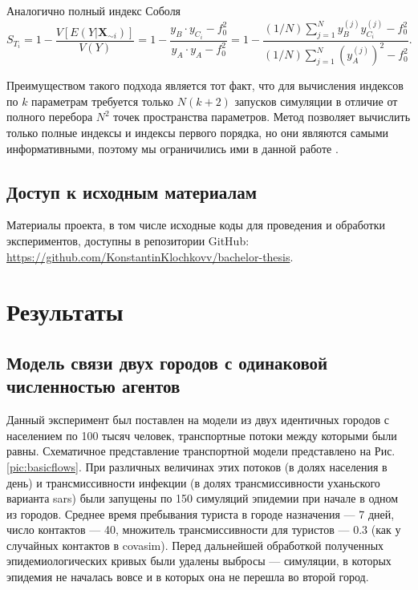\documentclass[a4paper,12pt]{article} %
\begin{document}
\begin{itemize}
Аналогично полный индекс Соболя
\begin{displaymath}
S_{T_i}=1-\frac{V[E(Y|\bm{X}_{\sim i})]}{V(Y)}=1-\frac{y_B\cdot y_{C_i}-f_0^2}{y_A\cdot y_A -f_0^2}=1-\frac{(1/N)\sum_{j=1}^N y_B^{(j)}y_{C_i}^{(j)} - f_0^2}{(1/N)\sum_{j=1}^N (y_A^{(j)})^2 - f_0^2}.
\end{displaymath}
\end{itemize}

Преимуществом такого подхода является тот факт, что для вычисления индексов по $k$ параметрам требуется только $N(k+2)$ запусков симуляции в отличие от полного перебора $N^2$ точек пространства параметров. Метод позволяет вычислить только полные индексы и индексы первого порядка, но они являются самыми информативными, поэтому мы ограничились ими в данной работе \cite{saltelli2008global}.

\subsection{Доступ к исходным материалам}
Материалы проекта, в том числе исходные коды для проведения и обработки экспериментов, доступны в репозитории GitHub: \href{https://github.com/KonstantinKlochkovv/bachelor-thesis}{https://github.com/KonstantinKlochkovv/\-bachelor-thesis}.

\newpage
\section{Результаты}

\subsection{Модель связи двух городов с одинаковой численностью агентов}
Данный эксперимент был поставлен на модели из двух идентичных городов с населением по 100 тысяч человек, транспортные потоки между которыми были равны. Схематичное представление транспортной модели представлено на Рис. \ref{pic:basicflows}. При различных величинах этих потоков (в долях населения в день) и трансмиссивности инфекции (в долях трансмиссивности уханьского варианта \gls{sars}) были запущены по 150 симуляций эпидемии при начале в одном из городов. Среднее время пребывания туриста в городе назначения --- 7 дней, число контактов --- 40, множитель трансмиссивности для туристов --- 0.3 (как у случайных контактов в \gls{covasim}). Перед дальнейшей обработкой полученных эпидемиологических кривых были удалены выбросы --- симуляции, в которых эпидемия не началась вовсе и в которых она не перешла во второй город. 
\end{document}
